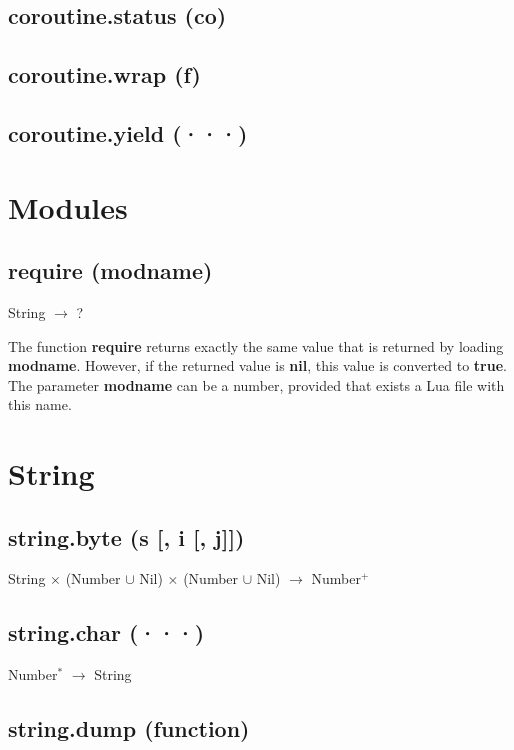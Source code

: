 \documentclass[12pt]{article}
\begin{document}
\subsection{coroutine.status (co)}

\subsection{coroutine.wrap (f)}

\subsection{coroutine.yield (···)}

\newpage

\section{Modules}

\subsection{require (modname)}

String $\rightarrow$ ?

The function \textbf{require} returns exactly the same value that is
returned by loading \textbf{modname}.
However, if the returned value is \textbf{nil}, this value is
converted to \textbf{true}.
The parameter \textbf{modname} can be a number, provided that exists
a Lua file with this name.

\newpage

\section{String}

\subsection{string.byte (s [, i [, j]])}

String $\times$
(Number $\cup$ Nil) $\times$
(Number $\cup$ Nil) $\rightarrow$
Number$^+$

\subsection{string.char (···)}

Number$^*$ $\rightarrow$ String

\subsection{string.dump (function)}
\end{document}
